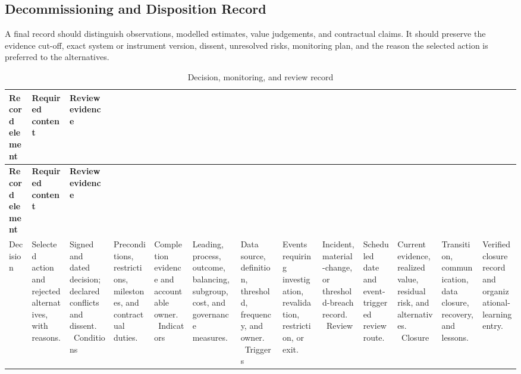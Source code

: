 \subsection{Decommissioning and Disposition Record}
\label{sec:comp-ch14-supp-3}
A final record should distinguish observations, modelled estimates, value
judgements, and contractual claims. It should preserve the evidence cut-off, exact
system or instrument version, dissent, unresolved risks, monitoring plan, and the
reason the selected action is preferred to the alternatives.

\begin{longtable}{@{}p{}p{}p{}@{}}
\caption{Decision, monitoring, and review record}
\label{tab:comp-ch14-decision-record}\\
\toprule
\textbf{Record element} & \textbf{Required content} & \textbf{Review evidence} \\
\midrule
\endfirsthead
\toprule
\textbf{Record element} & \textbf{Required content} & \textbf{Review evidence} \\
\midrule
\endhead
\bottomrule
\endlastfoot
Decision & Selected action and rejected alternatives, with reasons. & Signed and dated decision; declared conflicts and dissent. \
Conditions & Preconditions, restrictions, milestones, and contractual duties. & Completion evidence and accountable owner. \
Indicators & Leading, process, outcome, balancing, subgroup, cost, and governance measures. & Data source, definition, threshold, frequency, and owner. \
Triggers & Events requiring investigation, revalidation, restriction, or exit. & Incident, material-change, or threshold-breach record. \
Review & Scheduled date and event-triggered review route. & Current evidence, realized value, residual risk, and alternatives. \
Closure & Transition, communication, data closure, recovery, and lessons. & Verified closure record and organizational-learning entry. \
\end{longtable}
